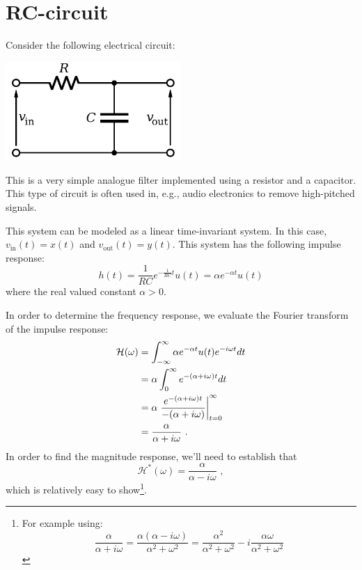 \newpage
\section{RC-circuit}
Consider the following electrical circuit:
\begin{center}
\includegraphics[width=0.5\textwidth]{Applications/figures/rc.pdf}
\end{center}
This is a very simple analogue filter implemented using a resistor and
a capacitor. This type of circuit is often used in, e.g., audio
electronics to remove high-pitched signals.

This system can be modeled as a linear time-invariant system. In this
case, $v_{\mathrm{in}}(t) = x(t)$ and $v_{\mathrm{out}}(t) =
y(t)$. This system has the following impulse response:
\begin{equation}
h(t) = \frac{1}{RC} e^{-\frac{1}{RC}t}u(t) = \alpha e^{-\alpha t} u(t)
\end{equation}
where the real valued constant $\alpha > 0$. 

In order to determine the frequency response, we evaluate the Fourier 
transform of the impulse response:
\begin{align}
\mathcal{H}(\omega) &= \int_{-\infty}^{\infty} \alpha e^{-\alpha t} u(t) e^{-i\omega t}dt \\
     &= \alpha \int_{0}^{\infty} e^{-(\alpha+i\omega) t} dt \\
     &= \alpha \left. \frac{e^{-(\alpha+i\omega)t}}{-(\alpha+i\omega)}\right\rvert_{t=0}^{\infty} \\
     &= \frac{\alpha}{\alpha + i\omega}\,\,.
\end{align}
In order to find the magnitude response, we'll need to establish that
\begin{equation}
  \mathcal{H}^*(\omega) = \frac{\alpha}{\alpha - i\omega}\,\,,
\end{equation}
which is relatively easy to show\footnote{For example using: \begin{equation*}\frac{\alpha}{\alpha + i \omega} = \frac{\alpha(\alpha - i\omega)}{\alpha^2 + \omega^2} = \frac{\alpha^2}{\alpha^2 + \omega^2} - i\frac{\alpha\omega}{\alpha^2 + \omega^2}\end{equation*}}.

